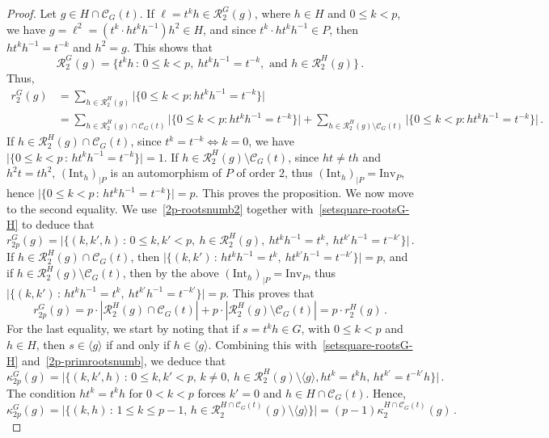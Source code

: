 \documentclass[12pt]{amsart}
\numberwithin{equation}{section}
\theoremstyle{definition}
\theoremstyle{remark}
\begin{document}
    \begin{proof}
        Let $g\in H\cap\mathcal{C}_G(t)$. If $\ell=t^k h\in \mathcal{R}_2^G(g)$, where $h\in H$ and $0\le k<p$, we have $g=\ell^2=(t^k\cdot ht^kh^{-1})h^2\in H$, and since $t^k\cdot ht^kh^{-1}\in P$, then $ht^kh^{-1}=t^{-k}$ and $h^2=g$. This shows that \begin{equation}\label{setsquare-rootsG-H}
            \mathcal{R}_2^G(g)=\{t^k h\, \colon\,  0\le k<p,\  ht^{k}h^{-1}=t^{-k},\text{ and } h\in \mathcal{R}_2^H(g)\}\, .
        \end{equation}
        Thus, \begin{align*}
            r_2^G(g)&=\sum_{h\in \mathcal{R}_2^H(g)}\bigl|\{0\le k<p \colon ht^{k}h^{-1}=t^{-k}\}\bigr|\\
            &=\sum_{h\in \mathcal{R}_2^H(g)\cap \mathcal{C}_G(t)}\bigl|\{0\le k<p \colon  ht^{k}h^{-1}=t^{-k}\}\bigr|+\sum_{h\in \mathcal{R}_2^H(g)\setminus\mathcal{C}_G(t) }\bigl|\{0\le k<p \colon ht^{k}h^{-1}=t^{-k}\}\bigr|\, .
        \end{align*}
        If $h\in \mathcal{R}_2^H(g)\cap \mathcal{C}_G(t)$, since $t^k=t^{-k}\iff k=0$, we have $\bigl|\{0\le k<p\, \colon\,  ht^{k}h^{-1}=t^{-k}\}\bigr|=1$. If $h\in \mathcal{R}_2^H(g)\setminus\mathcal{C}_G(t) $, since $ht\ne th$ and $h^2t=th^2$, $(\mathrm{Int}_h)_{|P}$ is an automorphism of $P$ of order $2$, thus $(\mathrm{Int}_h)_{|P}=\mathrm{Inv}_P$, hence $\bigl|\{0\le k<p\, \colon\,  ht^{k}h^{-1}=t^{-k}\}\bigr|=p$. This proves the proposition. We now move to the second equality. We use~\eqref{2p-rootsnumb2} together with~\eqref{setsquare-rootsG-H} to deduce that \[r_{2p}^G(g)=\bigl|\bigl\{ (k,k',h)\, \colon\,  0\le k,k'<p,\ h\in \mathcal{R}_{2}^H(g), \ ht^kh^{-1}=t^k,\ ht^{k'}h^{-1}=t^{-k'}\bigr\}\bigr|\, .\]
        If $h\in \mathcal{R}_2^H(g)\cap \mathcal{C}_G(t)$, then $\bigl|\{(k,k')\, \colon\,  ht^kh^{-1}=t^k,\ ht^{k'}h^{-1}=t^{-k'}\}\bigr|=p$, and if $h\in \mathcal{R}_2^H(g)\setminus \mathcal{C}_G(t) $, then by the above $(\mathrm{Int}_h)_{|P}=\mathrm{Inv}_P$, thus $\bigl|\{(k,k')\, \colon\,  ht^kh^{-1}=t^k,\ ht^{k'}h^{-1}=t^{-k'}\}\bigr|=p$. This proves that \[r_{2p}^G(g)=p \cdot|\mathcal{R}_2^H(g)\cap \mathcal{C}_G(t)|+p\cdot |\mathcal{R}_2^H(g)\setminus \mathcal{C}_G(t)|=p\cdot r_2^H(g)\, . \]
        For the last equality, we start by noting that if $s=t^k h\in G$, with $0\le k<p$ and $h\in H$, then $s\in \langle g\rangle$ if and only if $h\in \langle g\rangle$.  Combining this with~\eqref{setsquare-rootsG-H} and~\eqref{2p-primrootsnumb}, we deduce that
        \[\kappa_{2p}^G(g)=\bigl|\bigl\{(k,k',h)\, \colon\, 0\le k,k'<p,\, k\ne 0,\,  h\in \mathcal{R}_2^H(g)\setminus\langle g\rangle, ht^k=t^kh,\, ht^{k'}=t^{-k'}h\bigr\}\bigr|\, . \]
        The condition $ht^{k}=t^kh$ for $0<k<p$ forces $k'=0$ and $h\in H\cap \mathcal{C}_G(t)$. Hence, 
        \[  \kappa_{2p}^G(g)=\bigl|\bigl\{ (k,h)\, \colon \, 1\le k\le p-1,\, h\in \mathcal{R}_{2}^{H\cap \mathcal{C}_G(t)}(g)\setminus\langle g\rangle\bigr\}\bigr|=(p-1)\kappa_2^{H\cap \mathcal{C}_G(t)}(g)\, .  \]
        \end{proof}
\end{document}
